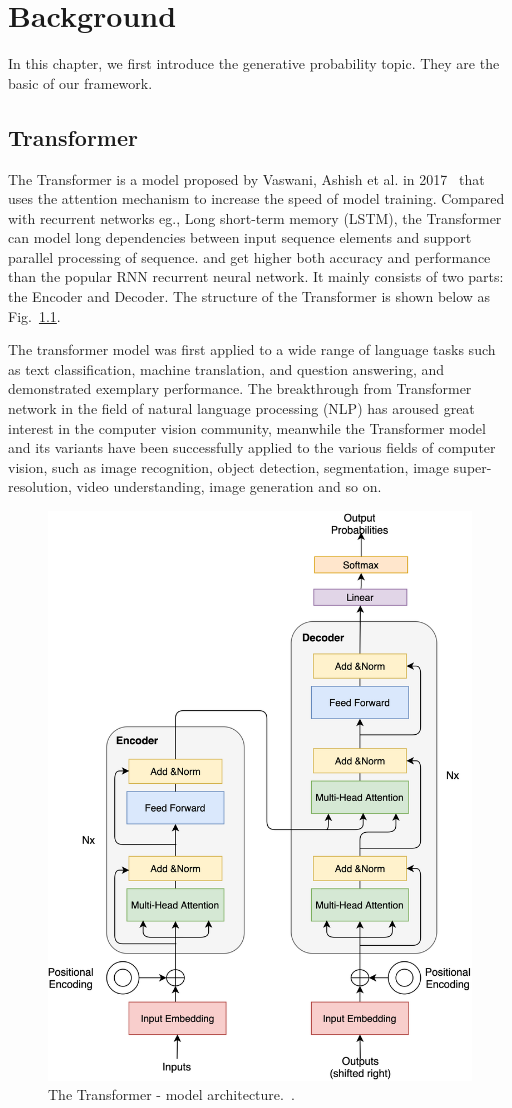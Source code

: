 \chapter{Background}
\label{chap:bg}
In this chapter, we first introduce the generative probability topic.
They are the basic of our framework.

\section{Transformer}
\label{section:transformer}
The Transformer is a model proposed by Vaswani, Ashish et al. in 2017~\cite{vaswani2017attention}  that uses the attention mechanism to increase the speed of model training. Compared with recurrent networks eg., Long short-term memory (LSTM), the Transformer can model long dependencies between input sequence elements and support parallel processing of sequence. and get higher both accuracy and performance than the popular RNN recurrent neural network. It mainly consists of two parts: the Encoder and Decoder. The structure of the Transformer is shown below as Fig.~\ref{fig:transformer}.

The transformer model  was first applied to a wide range of language tasks such as text classification, machine translation, and question answering, and demonstrated exemplary performance. The breakthrough from Transformer network in the field of natural language processing (NLP) has aroused great interest in the computer vision community, meanwhile the Transformer model and its variants have been successfully applied to the various fields of computer vision, such as image recognition, object detection, segmentation, image super-resolution, video understanding, image generation and so on. 

\begin{figure}[!htbp]
	\centering
	\includegraphics[width = 0.5 \textwidth]{figures/transformer.png}
	\caption[The Transformer - model architecture]
	{ The Transformer - model architecture.~\cite{vaswani2017attention}.}
	\label{fig:transformer}
\end{figure}

